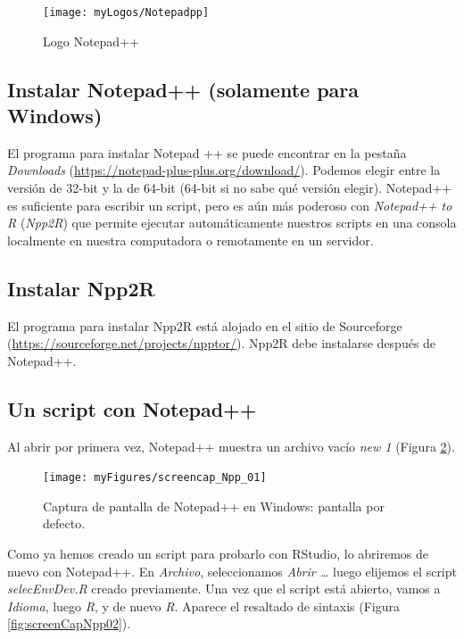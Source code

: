 \documentclass[
]{book}
\begin{document}
\begin{figure}
\texttt{[image: myLogos/Notepadpp]} \caption{Logo Notepad++\label{fig:logoNotepad}}\label{fig:logoNotepad}
\end{figure}

\hypertarget{instalar-notepad-solamente-para-windows}{%
\subsection{Instalar Notepad++ (solamente para Windows)}\label{instalar-notepad-solamente-para-windows}}

El programa para instalar Notepad ++ se puede encontrar en la pestaña \emph{Downloads} (\url{https://notepad-plus-plus.org/download/}). Podemos elegir entre la versión de 32-bit y la de 64-bit (64-bit si no sabe qué versión elegir). Notepad++ es suficiente para escribir un script, pero es aún más poderoso con \emph{Notepad++ to R} (\emph{Npp2R}) que permite ejecutar automáticamente nuestros scripts en una consola localmente en nuestra computadora o remotamente en un servidor.

\hypertarget{instalar-npp2r}{%
\subsection{Instalar Npp2R}\label{instalar-npp2r}}

El programa para instalar Npp2R está alojado en el sitio de Sourceforge (\url{https://sourceforge.net/projects/npptor/}). Npp2R debe instalarse después de Notepad++.

\hypertarget{un-script-con-notepad}{%
\subsection{Un script con Notepad++}\label{un-script-con-notepad}}

Al abrir por primera vez, Notepad++ muestra un archivo vacío \emph{new 1} (Figura \ref{fig:screenCapNpp01}).

\begin{figure}
\texttt{[image: myFigures/screencap\_Npp\_01]} \caption{Captura de pantalla de Notepad++ en Windows: pantalla por defecto.\label{fig:screenCapNpp01}}\label{fig:screenCapNpp01}
\end{figure}

Como ya hemos creado un script para probarlo con RStudio, lo abriremos de nuevo con Notepad++. En \emph{Archivo}, seleccionamos \emph{Abrir \ldots{}} luego elijemos el script \emph{selecEnvDev.R} creado previamente. Una vez que el script está abierto, vamos a \emph{Idioma}, luego \emph{R}, y de nuevo \emph{R}. Aparece el resaltado de sintaxis (Figura \ref{fig:screenCapNpp02}).
\end{document}
